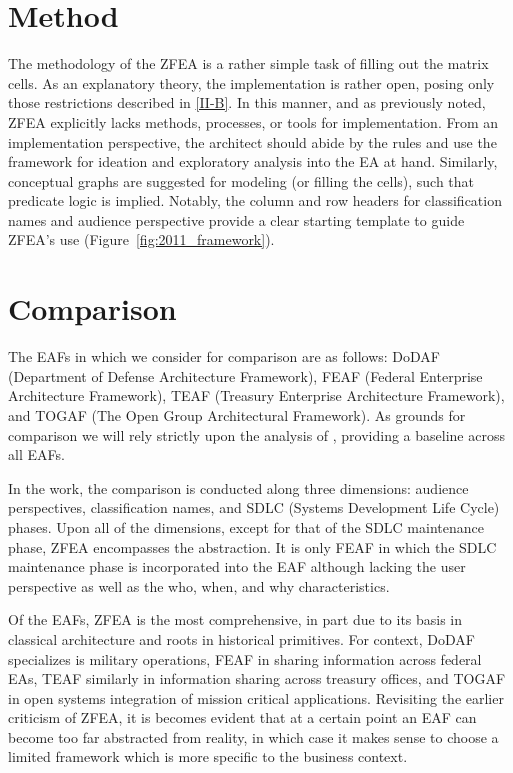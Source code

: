 \documentclass[12pt,conference]{IEEEtran}
\begin{document}
\section{Method}
The methodology of the ZFEA is a rather simple task of filling out the matrix cells. 
As an explanatory theory, the implementation is rather open, posing only those restrictions described in \ref{II-B}.
In this manner, and as previously noted, ZFEA explicitly lacks methods, processes, or tools for implementation. 
From an implementation perspective, the architect should abide by the rules and use the framework for ideation and exploratory analysis into the EA at hand. 
Similarly, conceptual graphs are suggested for modeling (or filling the cells), such that predicate logic is implied.
Notably, the column and row headers for classification names and audience perspective provide a clear starting template to guide ZFEA's use (Figure~\ref{fig:2011_framework}).

\section{Comparison}
The EAFs in which we consider for comparison are as follows: DoDAF (Department of Defense Architecture Framework), FEAF (Federal Enterprise Architecture Framework), TEAF (Treasury Enterprise Architecture Framework), and TOGAF (The Open Group Architectural Framework).
As grounds for comparison we will rely strictly upon the analysis of \cite{soa_comparison}, providing a baseline across all EAFs. 

In the work, the comparison is conducted along three dimensions: audience perspectives, classification names, and SDLC (Systems Development Life Cycle) phases. 
Upon all of the dimensions, except for that of the SDLC maintenance phase, ZFEA encompasses the abstraction.
It is only FEAF in which the SDLC maintenance phase is incorporated into the EAF although lacking the user perspective as well as the who, when, and why characteristics.  

Of the EAFs, ZFEA is the most comprehensive, in part due to its basis in classical architecture and roots in historical primitives. 
For context, DoDAF specializes is military operations, FEAF in sharing information across federal EAs, TEAF similarly in information sharing across treasury offices, and TOGAF in open systems integration of mission critical applications. 
Revisiting the earlier criticism of ZFEA, it is becomes evident that at a certain point an EAF can become too far abstracted from reality, in which case it makes sense to choose a limited framework which is more specific to the business context. 
\end{document}
